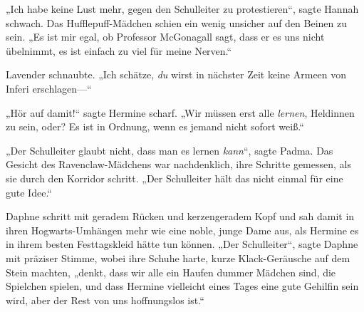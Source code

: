 „Ich habe keine Lust mehr, gegen den Schulleiter zu protestieren“, sagte Hannah schwach. Das Hufflepuff-Mädchen schien ein wenig unsicher auf den Beinen zu sein.
„Es ist mir egal, ob Professor McGonagall sagt, dass er es uns nicht übelnimmt, es ist einfach zu viel für meine Nerven.“

Lavender schnaubte.
„Ich schätze, \emph{du} wirst in nächster Zeit keine Armeen von Inferi erschlagen—“

„Hör auf damit!“ sagte Hermine scharf.
„Wir müssen erst alle \emph{lernen}, Heldinnen zu sein, oder? Es ist in Ordnung, wenn es jemand nicht sofort weiß.“

„Der Schulleiter glaubt nicht, dass man es lernen \emph{kann}“, sagte Padma. Das Gesicht des Ravenclaw-Mädchens war nachdenklich, ihre Schritte gemessen, als sie durch den Korridor schritt.
„Der Schulleiter hält das nicht einmal für eine gute Idee.“

Daphne schritt mit geradem Rücken und kerzengeradem Kopf und sah damit in ihren Hogwarts-Umhängen mehr wie eine noble, junge Dame aus, als Hermine es in ihrem besten Festtagskleid hätte tun können.
„Der Schulleiter“, sagte Daphne mit präziser Stimme, wobei ihre Schuhe harte, kurze Klack-Geräusche auf dem Stein machten, „denkt, dass wir alle ein Haufen dummer Mädchen sind, die Spielchen spielen, und dass Hermine vielleicht eines Tages eine gute Gehilfin sein wird, aber der Rest von uns hoffnungslos ist.“

